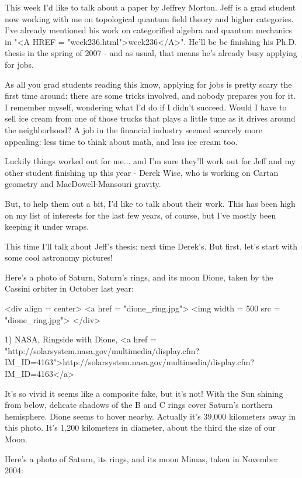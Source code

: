 

This week I'd like to talk about a paper by Jeffrey Morton.  Jeff is a
grad student now working with me on topological quantum field theory
and higher categories.  I've already mentioned his work on
categorified algebra and quantum mechanics in "<A HREF =
"week236.html">week236</A>".  He'll be be finishing his
Ph.D. thesis in the spring of 2007 - and as usual, that means he's
already busy applying for jobs.

As all you grad students reading this know, applying for jobs is
pretty scary the first time around: there are some tricks involved, 
and nobody prepares you for it.  I remember myself, wondering what 
I'd do if I didn't succeed.  Would I have to sell ice cream from one 
of those trucks that plays a little tune as it drives around the 
neighborhood?  A job in the financial industry seemed scarcely more 
appealing: less time to think about math, and less ice cream too.

Luckily things worked out for me... and I'm sure they'll work out
for Jeff and my other student finishing up this year - Derek Wise, 
who is working on Cartan geometry and MacDowell-Mansouri gravity. 

But, to help them out a bit, I'd like to talk about their work.  
This has been high on my list of interests for the last few years, 
of course, but I've mostly been keeping it under wraps.   

This time I'll talk about Jeff's thesis; next time Derek's.  But 
first, let's start with some cool astronomy pictures!

Here's a photo of Saturn, Saturn's rings, and its moon Dione, taken by 
the Cassini orbiter in October last year:

<div align = center>
<a href = "dione_ring.jpg">
<img width = 500 src = "dione_ring.jpg">
</div>

1) NASA, Ringside with Dione, 
<a href = "http://solarsystem.nasa.gov/multimedia/display.cfm?IM_ID=4163">http://solarsystem.nasa.gov/multimedia/display.cfm?IM_ID=4163</a>

It's so vivid it seems like a composite fake, but it's not!  With
the Sun shining from below, delicate shadows of the B and C rings 
cover Saturn's northern hemisphere.   Dione seems to hover nearby.
Actually it's 39,000 kilometers away in this photo.  It's 1,200 
kilometers in diameter, about the third the size of our Moon.

Here's a photo of Saturn, its rings, and its moon Mimas, taken 
in November 2004:

